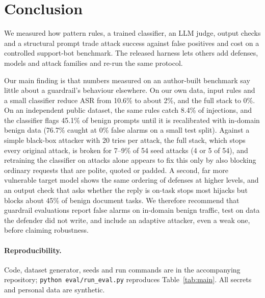 \documentclass[11pt]{article}
\begin{document}
\section{Conclusion}
We measured how pattern rules, a trained classifier, an LLM judge, output checks and a structural prompt trade attack
success against false positives and cost on a controlled support-bot benchmark. The released harness lets others add
defenses, models and attack families and re-run the same protocol.

Our main finding is that numbers measured on an author-built benchmark say little about a guardrail's behaviour elsewhere.
On our own data, input rules and a small classifier reduce ASR from 10.6\% to about 2\%, and the full stack to 0\%. On an
independent public dataset, the same rules catch 8.4\% of injections, and the classifier flags 45.1\% of benign prompts
until it is recalibrated with in-domain benign data (76.7\% caught at 0\% false alarms on a small test split). Against a simple
black-box attacker with 20 tries per attack, the full stack, which stops every original attack, is broken for 7--9\% of 54 seed attacks (4 or 5 of 54), and retraining the classifier on attacks alone appears to fix this only by also blocking ordinary requests that are
polite, quoted or padded. A second, far more vulnerable target model shows the same ordering of defenses at higher levels, and an output
check that asks whether the reply is on-task stops most hijacks but blocks about 45\% of benign document tasks. We therefore recommend that guardrail evaluations report false alarms on in-domain benign traffic,
test on data the defender did not write, and include an adaptive attacker, even a weak one, before claiming robustness.

\paragraph{Reproducibility.} Code, dataset generator, seeds and run commands are in the accompanying repository;
\texttt{python eval/run\_eval.py} reproduces Table~\ref{tab:main}. All secrets and personal data are synthetic.



\end{document}

